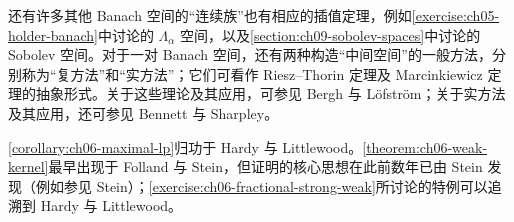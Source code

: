 \documentclass[../../main.tex]{subfiles}
\begin{document}
还有许多其他 Banach 空间的“连续族”也有相应的插值定理，例如\cref{exercise:ch05-holder-banach}中讨论的 $\Lambda_\alpha$ 空间，以及\cref{section:ch09-sobolev-spaces}中讨论的 Sobolev 空间。对于一对 Banach 空间，还有两种构造“中间空间”的一般方法，分别称为“复方法”和“实方法”；它们可看作 Riesz–Thorin 定理及 Marcinkiewicz 定理的抽象形式。关于这些理论及其应用，可参见 Bergh 与 Löfström\cite{folland-bib-16}；关于实方法及其应用，还可参见 Bennett 与 Sharpley\cite{folland-bib-15}。

\cref{corollary:ch06-maximal-lp}归功于 Hardy 与 Littlewood\cite{folland-bib-064}。\cref{theorem:ch06-weak-kernel}最早出现于 Folland 与 Stein\cite{folland-bib-51}，但证明的核心思想在此前数年已由 Stein 发现（例如参见 Stein\cite[第5.1节]{folland-bib-140}）；\cref{exercise:ch06-fractional-strong-weak}所讨论的特例可以追溯到 Hardy 与 Littlewood\cite{folland-bib-63}。
\end{document}

